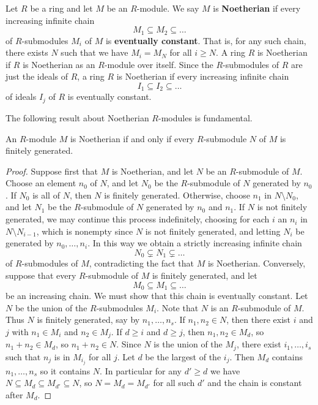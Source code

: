 \begin{definition}
Let $ R $ be a ring and let $ M $ be an $ R $-module. We say $ M $ is \textbf{Noetherian} if every increasing infinite chain
$$ M_1 \subseteq M_2 \subseteq \dots $$
of $ R $-submodules $ M_i $ of $ M $ is \textbf{eventually constant}. That is, for any such chain, there exists $ N $ such that we have $ M_i = M_N $ for all $ i \ge N $. A ring $ R $ is Noetherian if $ R $ is Noetherian as an $ R $-module over itself. Since the $ R $-submodules of $ R $ are just the ideals of $ R $, a ring $ R $ is Noetherian if every increasing infinite chain
$$ I_1 \subseteq I_2 \subseteq \dots $$
of ideals $ I_j $ of $ R $ is eventually constant.
\end{definition}

The following result about Noetherian $ R $-modules is fundamental.

\begin{theorem}
An $ R $-module $ M $ is Noetherian if and only if every $ R $-submodule $ N $ of $ M $ is finitely generated.
\end{theorem}

\begin{proof}
Suppose first that $ M $ is Noetherian, and let $ N $ be an $ R $-submodule of $ M $. Choose an element $ n_0 $ of $ N $, and let $ N_0 $ be the $ R $-submodule of $ N $ generated by $ n_0 $. If $ N_0 $ is all of $ N $, then $ N $ is finitely generated. Otherwise, choose $ n_1 $ in $ N \setminus N_0 $, and let $ N_1 $ be the $ R $-submodule of $ N $ generated by $ n_0 $ and $ n_1 $. If $ N $ is not finitely generated, we may continue this process indefinitely, choosing for each $ i $ an $ n_i $ in $ N \setminus N_{i - 1} $, which is nonempty since $ N $ is not finitely generated, and letting $ N_i $ be generated by $ n_0, \dots, n_i $. In this way we obtain a strictly increasing infinite chain
$$ N_0 \subsetneq N_1 \subsetneq \dots $$
of $ R $-submodules of $ M $, contradicting the fact that $ M $ is Noetherian. Conversely, suppose that every $ R $-submodule of $ M $ is finitely generated, and let
$$ M_0 \subseteq M_1 \subseteq \dots $$
be an increasing chain. We must show that this chain is eventually constant. Let $ N $ be the union of the $ R $-submodules $ M_i $. Note that $ N $ is an $ R $-submodule of $ M $. Thus $ N $ is finitely generated, say by $ n_1, \dots, n_s $. If $ n_1, n_2 \in N $, then there exist $ i $ and $ j $ with $ n_1 \in M_i $ and $ n_2 \in M_j $. If $ d \ge i $ and $ d \ge j $, then $ n_1, n_2 \in M_d $, so $ n_1 + n_2 \in M_d $, so $ n_1 + n_2 \in N $. Since $ N $ is the union of the $ M_j $, there exist $ i_1, \dots, i_s $ such that $ n_j $ is in $ M_{i_j} $ for all $ j $. Let $ d $ be the largest of the $ i_j $. Then $ M_d $ contains $ n_1, \dots, n_s $ so it contains $ N $. In particular for any $ d' \ge d $ we have $ N \subseteq M_d \subseteq M_{d'} \subseteq N $, so $ N = M_d = M_{d'} $ for all such $ d' $ and the chain is constant after $ M_d $.
\end{proof}

